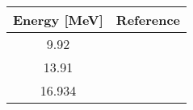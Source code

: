 \begin{tabular}{c c} 
    \toprule 
    \bf{Energy [MeV]} & \bf{Reference} \\
    \midrule
    9.92 & \cite{Guss85}\\
    13.91 & \cite{Guss85}\\
    16.934 & \cite{Pedroni88}\\
    \bottomrule
\end{tabular}
